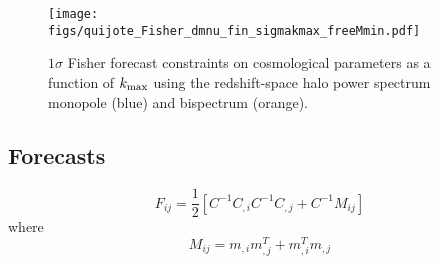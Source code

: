 \documentclass[12pt, letterpaper, preprint]{aastex62}
\newcommand{\smnu}{\sum m_\nu}
\newcommand{\sig}{\sigma_8}
\newcommand{\beq}{\begin{equation}}
\newcommand{\eeq}{\end{equation}}
\newcommand{\ch}[1]{{\color{orange}{\bf CH:} #1}}
\begin{document}
\begin{figure}
\begin{center}
    \texttt{[image: figs/quijote\_Fisher\_dmnu\_fin\_sigmakmax\_freeMmin.pdf]} 
    \caption{$1\sigma$ Fisher forecast constraints on cosmological parameters as a function
    of $k_{\rm max}$ using the redshift-space halo power spectrum monopole (blue) and 
    bispectrum (orange). }
\label{fig:pk_fish_kmax}
\end{center}
\end{figure}

\subsection{Forecasts} \label{sec:forecasts}
\beq
F_{ij} = \frac{1}{2}[C^{-1}C_{,i}C^{-1}C_{,j} + C^{-1} M_{ij}]
\eeq
where
\beq
M_{ij} = m_{,i} m_{,j}^T + m_{,i}^T m_{,j}
\eeq


%
%

\end{document}
